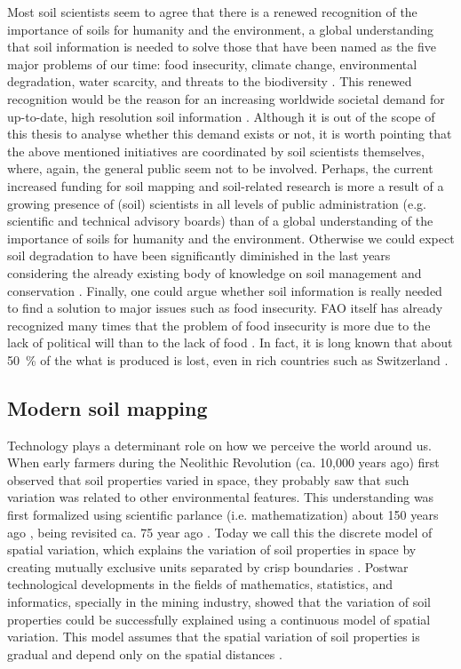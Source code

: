Most soil scientists seem to agree that there is a renewed recognition of the importance of soils 
for humanity and the environment, a global understanding that soil information is needed to solve 
those that have been named as the five major problems of our time: food insecurity, climate change, 
environmental degradation, water scarcity, and threats to the biodiversity \citep{SanchezEtAl2009}. 
This renewed recognition would be the reason for an increasing worldwide societal demand for 
up-to-date, high resolution soil information \citep{OmutoEtAl2013}. Although it is out of the scope 
of this thesis to analyse whether this demand exists or not, it is worth pointing that the above 
mentioned initiatives are coordinated by soil scientists themselves, where, again, the general 
public seem not to be involved. Perhaps, the current increased funding for soil mapping and 
soil-related research is more a result of a growing presence of (soil) scientists in all levels of 
public administration (e.g. scientific and technical advisory boards) than of a global understanding
of the importance of soils for humanity and the environment. Otherwise we could expect soil 
degradation to have been significantly diminished in the last years considering the already existing
body of knowledge on soil management and conservation \citep{Blanco-CanquiEtAl2010}. Finally, one 
could argue whether soil information is really needed to find a solution to major issues such as 
food insecurity. FAO itself has already recognized many times that the problem of food insecurity 
is more due to the lack of political will than to the lack of food \citep{FAO2005, FAO2009, FAO2015}.
In fact, it is long known that about \SI{50}{\percent} of the what is produced is lost, even in rich 
countries such as Switzerland \citep{BerettaEtAl2013}.



\subsection{Modern soil mapping} %

Technology plays a determinant role on how we perceive the world around us. When early farmers during the Neolithic Revolution (ca. 10,000 years ago) first observed that soil properties varied in space, they probably saw that such variation was related to other environmental features. This understanding was first formalized using scientific parlance (i.e. mathematization) about 150 years ago \cite{Florinsky2012}, being revisited ca. 75 year ago \cite{Jenny1941}. Today we call this the discrete model of spatial variation, which explains the variation of soil properties in space by creating mutually exclusive units separated by crisp boundaries \cite{Legros2006}. Postwar technological developments in the fields of mathematics, statistics, and informatics, specially in the mining industry, showed that the variation of soil properties could be successfully explained using a continuous model of spatial variation. This model assumes that the spatial variation of soil properties is gradual and depend only on the spatial distances \cite{WebsterEtAl1990}.

